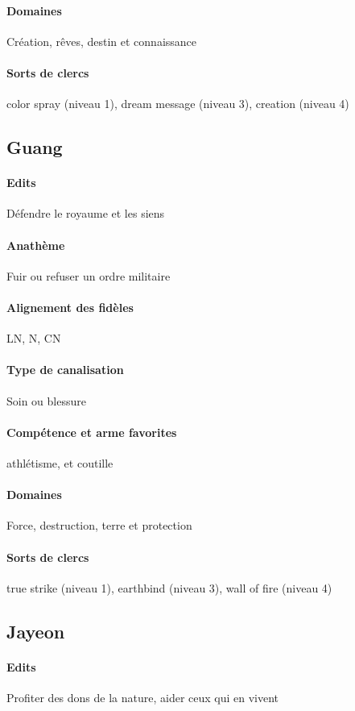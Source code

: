 \documentclass[10pt,a4paper]{book}
\begin{document}
\paragraph{Domaines}Création, rêves, destin et connaissance
\paragraph{Sorts de clercs}color spray (niveau 1), dream message (niveau 3), creation (niveau 4)
\subsection{Guang}
\paragraph{Edits}Défendre le royaume et les siens
\paragraph{Anathème}Fuir ou refuser un ordre militaire
\paragraph{Alignement des fidèles} LN, N, CN
\paragraph{Type de canalisation}Soin ou blessure
\paragraph{Compétence et arme favorites}athlétisme, et coutille
\paragraph{Domaines}Force, destruction, terre et protection
\paragraph{Sorts de clercs}true strike (niveau 1), earthbind (niveau 3), wall of fire (niveau 4)
\subsection{Jayeon}
\paragraph{Edits}Profiter des dons de la nature, aider ceux qui en vivent
\end{document}
